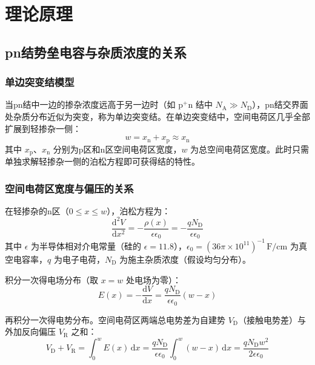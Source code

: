 \section{理论原理}

\subsection{pn结势垒电容与杂质浓度的关系}

\subsubsection{单边突变结模型}

当pn结中一边的掺杂浓度远高于另一边时（如 $\mathrm{p}^+\mathrm{n}$ 结中 $N_{\mathrm{A}} \gg N_{\mathrm{D}}$），pn结交界面处杂质分布近似为突变，称为单边突变结。在单边突变结中，空间电荷区几乎全部扩展到轻掺杂一侧：
\begin{equation}
w = x_{\mathrm{n}} + x_{\mathrm{p}} \approx x_{\mathrm{n}}
\end{equation}
其中 $x_{\mathrm{p}}$、$x_{\mathrm{n}}$ 分别为p区和n区空间电荷区宽度，$w$ 为总空间电荷区宽度。此时只需单独求解轻掺杂一侧的泊松方程即可获得结的特性。

\subsubsection{空间电荷区宽度与偏压的关系}

在轻掺杂的n区（$0 \leqslant x \leqslant w$），泊松方程为：
\begin{equation}
\frac{\mathrm{d}^2 V}{\mathrm{d} x^2} = -\frac{\rho(x)}{\epsilon\epsilon_0} = -\frac{qN_{\mathrm{D}}}{\epsilon\epsilon_0}
\end{equation}
其中 $\epsilon$ 为半导体相对介电常量（硅的 $\epsilon = 11.8$），$\epsilon_0 = (36\pi \times 10^{11})^{-1}\,\mathrm{F/cm}$ 为真空电容率，$q$ 为电子电荷，$N_{\mathrm{D}}$ 为施主杂质浓度（假设均匀分布）。

积分一次得电场分布（取 $x = w$ 处电场为零）：
\begin{equation}
E(x) = -\frac{\mathrm{d}V}{\mathrm{d}x} = \frac{qN_{\mathrm{D}}}{\epsilon\epsilon_0}(w - x)
\end{equation}

再积分一次得电势分布。空间电荷区两端总电势差为自建势 $V_{\mathrm{D}}$（接触电势差）与外加反向偏压 $V_{\mathrm{R}}$ 之和：
\begin{equation}
V_{\mathrm{D}} + V_{\mathrm{R}} = \int_{0}^{w} E(x)\,\mathrm{d}x = \frac{qN_{\mathrm{D}}}{\epsilon\epsilon_0}\int_{0}^{w}(w - x)\,\mathrm{d}x = \frac{qN_{\mathrm{D}}w^2}{2\epsilon\epsilon_0}
\end{equation}


